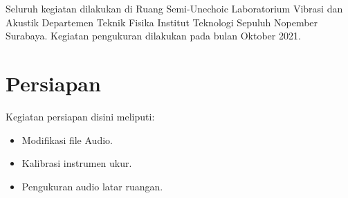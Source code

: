 \documentclass[12pt,]{article}
\begin{document}
	Seluruh kegiatan dilakukan di Ruang Semi-Unechoic Laboratorium Vibrasi dan Akustik
	Departemen Teknik Fisika Institut Teknologi Sepuluh Nopember Surabaya.
	Kegiatan pengukuran dilakukan pada bulan Oktober 2021.


	\newpage
	\section{Persiapan}

	Kegiatan persiapan disini meliputi:
	\begin{itemize}
		\item Modifikasi file Audio.
		\item Kalibrasi instrumen ukur.
		\item Pengukuran audio latar ruangan.
	\end{itemize}
\end{document}
